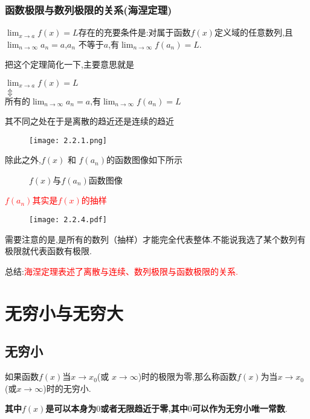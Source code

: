 \documentclass[12pt, a4paper, oneside, UTF8]{ctexbook}  %
\begin{document}
\subsubsection{函数极限与数列极限的关系(海涅定理)}
\begin{them}{}{}
    $\lim_{x \to a}f(x)=L$存在的充要条件是:对属于函数$f(x)$定义域的任意数列,且$\lim_{n\to\infty}a_n=a$,$a_n$ 不等于$a$,有$\lim_{n\to\infty}f(a_n)=L$.
\end{them}
把这个定理简化一下,主要意思就是
\begin{center}
    $\lim_{x\to a}f(x)=L$\\
    $\Updownarrow $ \\
    $\text{所有的}\lim_{n\to\infty}a_n=a\text{,有}\lim_{n\to\infty}f(a_n)=L$
\end{center}
其不同之处在于是离散的趋近还是连续的趋近
\begin{figure}[H]
    \centering \texttt{[image: 2.2.1.png]}
\end{figure}
除此之外,$f(x)$ 和 $f(a_n)$的函数图像如下所示
\begin{figure}[H] \centering
    \caption{$f(x)$与$f(a_n)$函数图像}
\end{figure}

\textcolor{red}{$f(a_n)$其实是$f(x)$的抽样}
\begin{figure}[htbp]
    \centering \texttt{[image: 2.2.4.pdf]}
\end{figure}
需要注意的是,是所有的数列（抽样）才能完全代表整体.不能说我选了某个数列有极限就代表函数有极限.

总结:\textcolor{red}{海涅定理表述了离散与连续、数列极限与函数极限的关系.}
\section{无穷小与无穷大}

\subsection{无穷小}
\begin{defn}{}{}
    如果函数$f(x)$当$x\to x_0$(或 $x\to\infty$)时的极限为零,那么称函数$f(x)$为当$x\to x_0$(或$x\to\infty$)时的无穷小.
\end{defn}
\textbf{其中$f(x)$是可以本身为$0$或者无限趋近于零,其中$0$可以作为无穷小唯一常数}.
\end{document}
